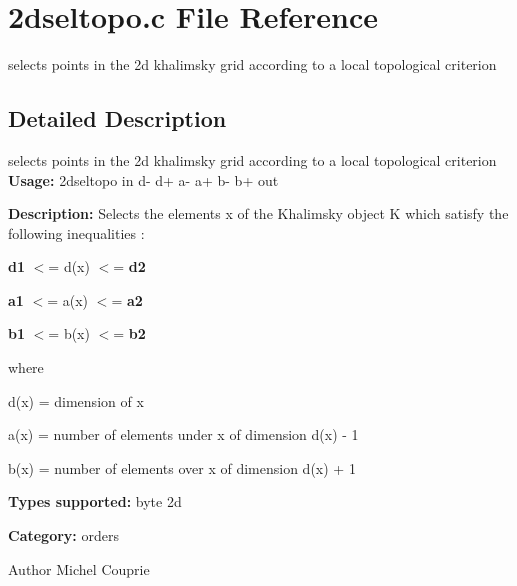 \section{2dseltopo.c File Reference}
\label{2dseltopo_8c}


selects points in the 2d khalimsky grid according to a local topological criterion  




\subsection{Detailed Description}
selects points in the 2d khalimsky grid according to a local topological criterion {\bfseries Usage:} 2dseltopo in d-\/ d+ a-\/ a+ b-\/ b+ out

{\bfseries Description:} Selects the elements x of the Khalimsky object K which satisfy the following inequalities :

{\bfseries d1} $<$= d(x) $<$= {\bfseries d2} 

{\bfseries a1} $<$= a(x) $<$= {\bfseries a2} 

{\bfseries b1} $<$= b(x) $<$= {\bfseries b2} 

where

d(x) = dimension of x

a(x) = number of elements under x of dimension d(x) -\/ 1

b(x) = number of elements over x of dimension d(x) + 1

{\bfseries Types supported:} byte 2d

{\bfseries Category:} orders

\begin{DoxyAuthor}{Author}
Michel Couprie 
\end{DoxyAuthor}
